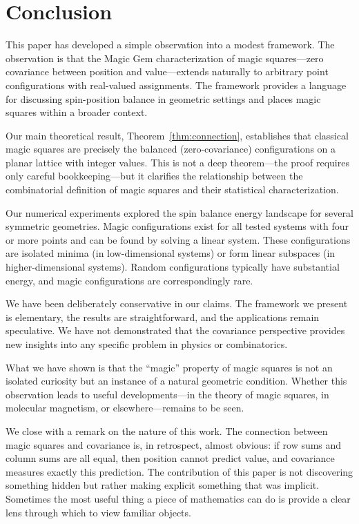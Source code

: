 \section{Conclusion}
\label{sec:conclusion}

This paper has developed a simple observation into a modest framework. The observation is that the Magic Gem characterization of magic squares---zero covariance between position and value---extends naturally to arbitrary point configurations with real-valued assignments. The framework provides a language for discussing spin-position balance in geometric settings and places magic squares within a broader context.

Our main theoretical result, Theorem~\ref{thm:connection}, establishes that classical magic squares are precisely the balanced (zero-covariance) configurations on a planar lattice with integer values. This is not a deep theorem---the proof requires only careful bookkeeping---but it clarifies the relationship between the combinatorial definition of magic squares and their statistical characterization.

Our numerical experiments explored the spin balance energy landscape for several symmetric geometries. Magic configurations exist for all tested systems with four or more points and can be found by solving a linear system. These configurations are isolated minima (in low-dimensional systems) or form linear subspaces (in higher-dimensional systems). Random configurations typically have substantial energy, and magic configurations are correspondingly rare.

We have been deliberately conservative in our claims. The framework we present is elementary, the results are straightforward, and the applications remain speculative. We have not demonstrated that the covariance perspective provides new insights into any specific problem in physics or combinatorics.

What we have shown is that the ``magic'' property of magic squares is not an isolated curiosity but an instance of a natural geometric condition. Whether this observation leads to useful developments---in the theory of magic squares, in molecular magnetism, or elsewhere---remains to be seen.

We close with a remark on the nature of this work. The connection between magic squares and covariance is, in retrospect, almost obvious: if row sums and column sums are all equal, then position cannot predict value, and covariance measures exactly this prediction. The contribution of this paper is not discovering something hidden but rather making explicit something that was implicit. Sometimes the most useful thing a piece of mathematics can do is provide a clear lens through which to view familiar objects.


